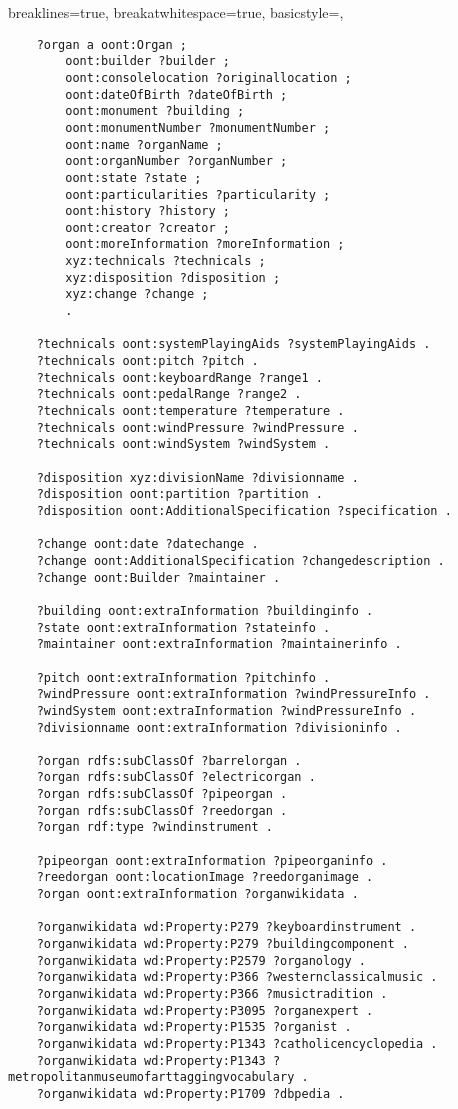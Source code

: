 \lstset
{
    breaklines=true,
    breakatwhitespace=true,
    basicstyle=\ttfamily,
}
\begin{lstlisting}
    ?organ a oont:Organ ;
        oont:builder ?builder ;
        oont:consolelocation ?originallocation ;
        oont:dateOfBirth ?dateOfBirth ;
        oont:monument ?building ;
        oont:monumentNumber ?monumentNumber ;
        oont:name ?organName ;
        oont:organNumber ?organNumber ;
        oont:state ?state ;
        oont:particularities ?particularity ;
        oont:history ?history ;
        oont:creator ?creator ;
        oont:moreInformation ?moreInformation ;
        xyz:technicals ?technicals ; 
        xyz:disposition ?disposition ;
        xyz:change ?change ;
        .

	?technicals oont:systemPlayingAids ?systemPlayingAids .
	?technicals oont:pitch ?pitch .
	?technicals oont:keyboardRange ?range1 . 
	?technicals oont:pedalRange ?range2 . 
	?technicals oont:temperature ?temperature .
	?technicals oont:windPressure ?windPressure .
	?technicals oont:windSystem ?windSystem .
	
	?disposition xyz:divisionName ?divisionname . 
	?disposition oont:partition ?partition .
	?disposition oont:AdditionalSpecification ?specification .

	?change oont:date ?datechange .
	?change oont:AdditionalSpecification ?changedescription . 
	?change oont:Builder ?maintainer .

	?building oont:extraInformation ?buildinginfo .
	?state oont:extraInformation ?stateinfo .
	?maintainer oont:extraInformation ?maintainerinfo .

	?pitch oont:extraInformation ?pitchinfo .
	?windPressure oont:extraInformation ?windPressureInfo .
	?windSystem oont:extraInformation ?windPressureInfo .
	?divisionname oont:extraInformation ?divisioninfo .

	?organ rdfs:subClassOf ?barrelorgan .
	?organ rdfs:subClassOf ?electricorgan .
	?organ rdfs:subClassOf ?pipeorgan .
	?organ rdfs:subClassOf ?reedorgan .
	?organ rdf:type ?windinstrument . 

	?pipeorgan oont:extraInformation ?pipeorganinfo .
	?reedorgan oont:locationImage ?reedorganimage .
	?organ oont:extraInformation ?organwikidata .

	?organwikidata wd:Property:P279 ?keyboardinstrument .
	?organwikidata wd:Property:P279 ?buildingcomponent .
	?organwikidata wd:Property:P2579 ?organology .
	?organwikidata wd:Property:P366 ?westernclassicalmusic .
	?organwikidata wd:Property:P366 ?musictradition .
	?organwikidata wd:Property:P3095 ?organexpert .
	?organwikidata wd:Property:P1535 ?organist .
	?organwikidata wd:Property:P1343 ?catholicencyclopedia .
	?organwikidata wd:Property:P1343 ?metropolitanmuseumofarttaggingvocabulary .
	?organwikidata wd:Property:P1709 ?dbpedia .


\end{lstlisting}
